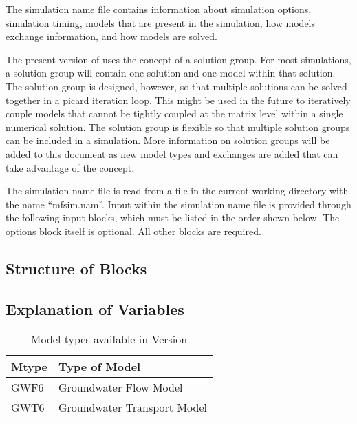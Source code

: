 The simulation name file contains information about simulation options, simulation timing, models that are present in the simulation, how models exchange information, and how models are solved.

The present version of \mf uses the concept of a solution group.  For most simulations, a solution group will contain one solution and one model within that solution.  The solution group is designed, however, so that multiple solutions can be solved together in a picard iteration loop.  This might be used in the future to iteratively couple models that cannot be tightly coupled at the matrix level within a single numerical solution.  The solution group is flexible so that multiple solution groups can be included in a simulation.  More information on solution groups will be added to this document as new model types and exchanges are added that can take advantage of the concept.

The simulation name file is read from a file in the current working directory with the name ``mfsim.nam''.  Input within the simulation name file is provided through the following input blocks, which must be listed in the order shown below.  The options block itself is optional.  All other blocks are required.

\vspace{5mm}
\subsection{Structure of Blocks}






\vspace{5mm}
\subsection{Explanation of Variables}
\begin{description}

\end{description}

\begin{table}[h]
\caption{Model types available in Version \modflowversion}
\small
\begin{center}
\begin{tabular*}{\columnwidth}{l l}
\hline
\hline
Mtype & Type of Model \\
\hline
GWF6 & Groundwater Flow Model \\
GWT6 & Groundwater Transport Model \\
\hline 
\end{tabular*}
\label{table:mtype}
\end{center}
\normalsize
\end{table}

